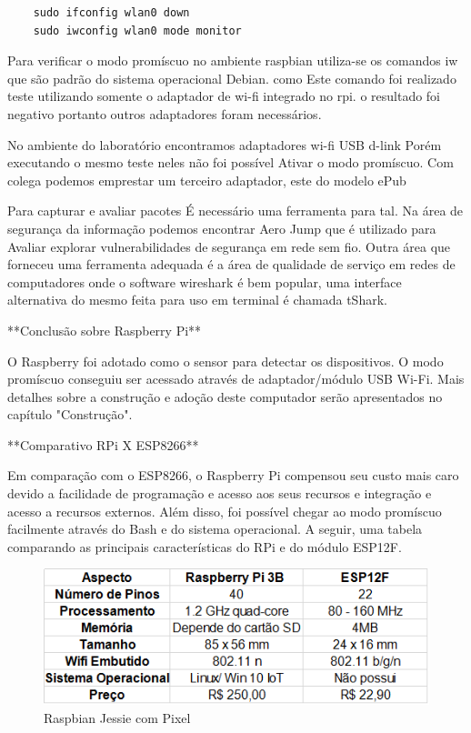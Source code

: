 \begin{verbatim}
	sudo ifconfig wlan0 down
	sudo iwconfig wlan0 mode monitor
\end{verbatim}

Para verificar o modo  promíscuo no ambiente raspbian utiliza-se os comandos iw
que são padrão do sistema operacional Debian.  como   Este comando foi realizado
teste  utilizando somente o adaptador  de wi-fi integrado   no rpi.  o resultado
foi negativo portanto  outros adaptadores foram necessários.

No ambiente do laboratório encontramos adaptadores wi-fi USB d-link Porém
executando o mesmo teste neles não foi possível Ativar o modo promíscuo.  Com
colega podemos emprestar um terceiro adaptador,  este do modelo ePub

Para capturar e avaliar pacotes É necessário uma ferramenta  para tal. Na área
de segurança da informação podemos encontrar Aero Jump que é utilizado para
Avaliar explorar vulnerabilidades de segurança em rede sem fio.  Outra área que
forneceu uma ferramenta adequada é a área de qualidade de serviço em redes de
computadores onde o software wireshark é bem popular,  uma interface alternativa
do mesmo  feita para uso em terminal é chamada tShark.


**Conclusão sobre Raspberry Pi**

O Raspberry foi adotado como o sensor para detectar os dispositivos. O modo
promíscuo conseguiu ser acessado através de adaptador/módulo USB Wi-Fi. Mais
detalhes sobre a construção e adoção deste computador serão apresentados no
capítulo "Construção".

**Comparativo RPi X ESP8266**

Em comparação com o ESP8266, o Raspberry Pi compensou seu custo mais caro devido
a facilidade de programação e acesso aos seus recursos e integração e acesso a
recursos externos. Além disso, foi possível chegar ao modo promíscuo facilmente
através do Bash e do sistema operacional. A seguir, uma tabela comparando as
principais características do RPi e do módulo ESP12F.

\begin{figure}[htb]
	\caption{\label{fig:raspbian-jessie}Raspbian Jessie com Pixel}
	\begin{center}
		\includegraphics[width=1\textwidth]{040-plataformas/Plataformas DIY e comparacao/rpi-esp.png}
	\end{center}
\end{figure}

